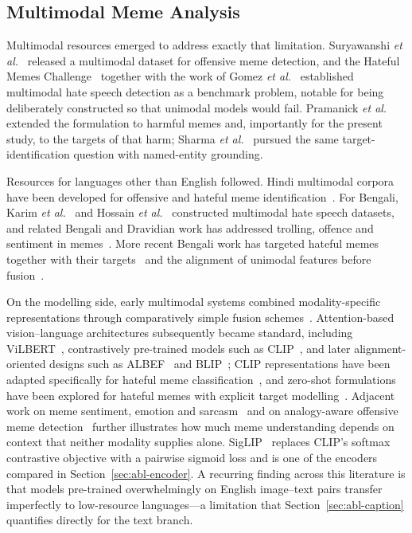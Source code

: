 \documentclass[conference]{IEEEtran}
\begin{document}
\subsection{Multimodal Meme Analysis}

Multimodal resources emerged to address exactly that limitation. Suryawanshi
\emph{et al.}~\cite{suryawanshi2020} released a multimodal dataset for offensive
meme detection, and the Hateful Memes Challenge~\cite{kiela2020} together with
the work of Gomez \emph{et al.}~\cite{gomez2020} established multimodal hate
speech detection as a benchmark problem, notable for being deliberately
constructed so that unimodal models would fail. Pramanick \emph{et
al.}~\cite{pramanick2021a,pramanick2021b} extended the formulation to harmful
memes and, importantly for the present study, to the targets of that harm;
Sharma \emph{et al.}~\cite{sharma2022} pursued the same target-identification
question with named-entity grounding.

Resources for languages other than English followed. Hindi multimodal corpora
have been developed for offensive and hateful meme
identification~\cite{kumari2023,rajput2022}. For Bengali, Karim \emph{et
al.}~\cite{karim2022} and Hossain \emph{et al.}~\cite{hossain2022b} constructed
multimodal hate speech datasets, and related Bengali and Dravidian work has
addressed trolling, offence and sentiment in
memes~\cite{hossain2021,hossain2022c,hasan2022,hossain2022a}. More recent
Bengali work has targeted hateful memes together with their
targets~\cite{hossain2024dora} and the alignment of unimodal features before
fusion~\cite{hossain2024align}.

On the modelling side, early multimodal systems combined modality-specific
representations through comparatively simple fusion
schemes~\cite{hossain2021,hossain2022c,hasan2022}. Attention-based
vision--language architectures subsequently became standard, including
ViLBERT~\cite{lu2019}, contrastively pre-trained models such as
CLIP~\cite{radford2021}, and later alignment-oriented designs such as
ALBEF~\cite{li2021} and BLIP~\cite{li2022}; CLIP representations have been
adapted specifically for hateful meme classification~\cite{kumar2022}, and
zero-shot formulations have been explored for hateful memes with explicit target
modelling~\cite{zhu2022}. Adjacent work on meme sentiment, emotion
and sarcasm~\cite{mishra2023,bandyopadhyay2023} and on analogy-aware offensive
meme detection~\cite{shang2021,zhou2021} further illustrates how much meme
understanding depends on context that neither modality supplies alone. SigLIP~\cite{zhai2023} replaces CLIP's softmax
contrastive objective with a pairwise sigmoid loss and is one of the encoders
compared in Section~\ref{sec:abl-encoder}. A recurring finding across this
literature is that models pre-trained overwhelmingly on English image--text
pairs transfer imperfectly to low-resource languages---a limitation that
Section~\ref{sec:abl-caption} quantifies directly for the text branch.
\end{document}
